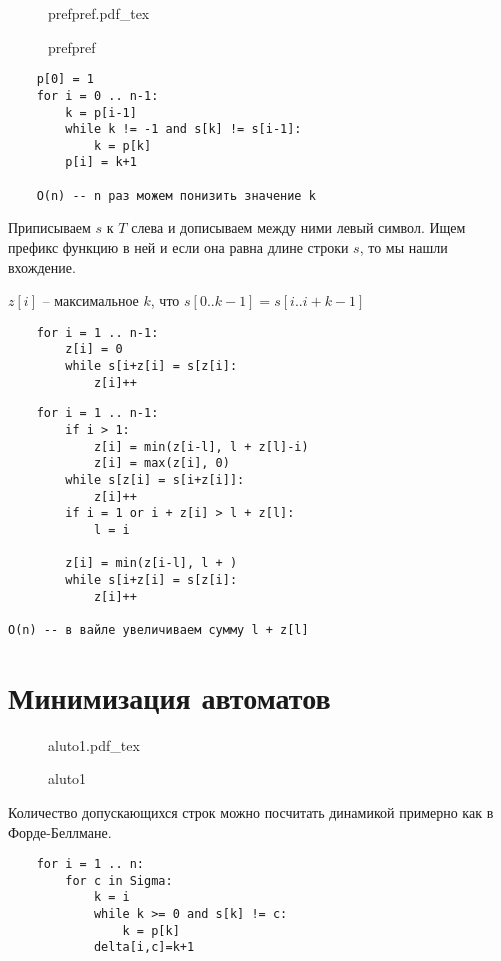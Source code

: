 \documentclass{book}
\theoremstyle{definition}
\newcommand{\incfig}[1]{%
    \def\svgwidth{\columnwidth}
    {#1.pdf_tex}
}
\begin{document}
\begin{figure}[!ht]
    \centering
    \incfig{prefpref}
    \caption{prefpref}
    \label{fig:prefpref}
\end{figure}

\begin{lstlisting}
    p[0] = 1
    for i = 0 .. n-1:
        k = p[i-1]
        while k != -1 and s[k] != s[i-1]:
            k = p[k]
        p[i] = k+1

    O(n) -- n раз можем понизить значение k
\end{lstlisting}

Приписываем $s$ к  $T$ слева и дописываем между ними левый символ. Ищем префикс функцию в ней и если она равна длине строки  $s$, то мы нашли вхождение.

 \begin{theorem}
    $z[i]$ -- максимальное $k$, что  $s[0..k-1] = s[i .. i+k-1]$
\end{theorem}

\begin{lstlisting}
    for i = 1 .. n-1:
        z[i] = 0
        while s[i+z[i] = s[z[i]:
            z[i]++
\end{lstlisting}        

\begin{lstlisting}
    for i = 1 .. n-1:
        if i > 1:
            z[i] = min(z[i-l], l + z[l]-i)
            z[i] = max(z[i], 0)
        while s[z[i] = s[i+z[i]]:
            z[i]++
        if i = 1 or i + z[i] > l + z[l]:
            l = i

        z[i] = min(z[i-l], l + )
        while s[i+z[i] = s[z[i]:
            z[i]++

O(n) -- в вайле увеличиваем сумму l + z[l]
\end{lstlisting}        

\section{Минимизация автоматов}

\begin{figure}[!ht]
    \centering
    \incfig{aluto1}
    \caption{aluto1}
    \label{fig:aluto1}
\end{figure}

Количество допускающихся строк можно посчитать динамикой примерно как в Форде-Беллмане.

\begin{lstlisting}
    for i = 1 .. n:
        for c in Sigma:
            k = i
            while k >= 0 and s[k] != c:
                k = p[k]
            delta[i,c]=k+1
\end{lstlisting}
\end{document}
